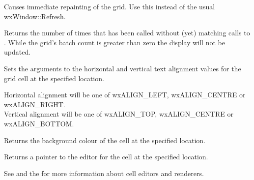 Causes immediate repainting of the grid. Use this instead of the usual wxWindow::Refresh.



\label{wxgridgetbatchcount}


Returns the number of times that  has been called
without (yet) matching calls to . While
the grid's batch count is greater than zero the display will not be updated.



\label{wxgridgetcellalignment}


Sets the arguments to the horizontal and vertical text alignment values for the
grid cell at the specified location.

Horizontal alignment will be one of wxALIGN\_LEFT, wxALIGN\_CENTRE or wxALIGN\_RIGHT. \\
Vertical alignment will be one of wxALIGN\_TOP, wxALIGN\_CENTRE or wxALIGN\_BOTTOM.




\label{wxgridgetcellbackgroundcolour}


Returns the background colour of the cell at the specified location.



\label{wxgridgetcelleditor}


Returns a pointer to the editor for the cell at the specified location.

See  and
the  for more information about cell editors and renderers.



\label{wxgridgetcellfont}

